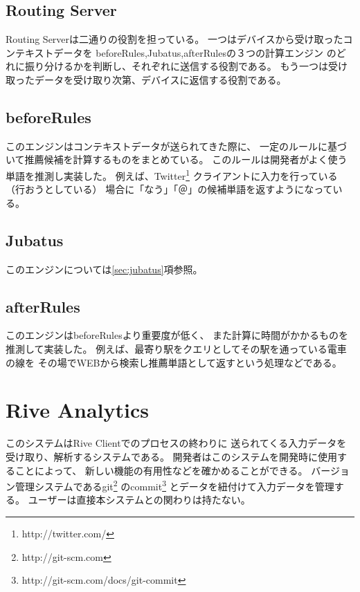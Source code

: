 \subsection{Routing Server}
Routing Serverは二通りの役割を担っている。
一つはデバイスから受け取ったコンテキストデータを
beforeRules,Jubatus,afterRulesの３つの計算エンジン
のどれに振り分けるかを判断し、それぞれに送信する役割である。
もう一つは受け取ったデータを受け取り次第、デバイスに返信する役割である。

\subsection{beforeRules}
\label{sec:beforerules}
このエンジンはコンテキストデータが送られてきた際に、
一定のルールに基づいて推薦候補を計算するものをまとめている。
このルールは開発者がよく使う単語を推測し実装した。
例えば、Twitter\footnote{http://twitter.com/}
クライアントに入力を行っている（行おうとしている）
場合に「なう」「＠」の候補単語を返すようになっている。

\subsection{Jubatus}
このエンジンについては\ref{sec:jubatus}項参照。

\subsection{afterRules}
\label{sec:afterrules}
このエンジンはbeforeRulesより重要度が低く、
また計算に時間がかかるものを推測して実装した。
例えば、最寄り駅をクエリとしてその駅を通っている電車の線を
その場でWEBから検索し推薦単語として返すという処理などである。

\section{Rive Analytics}
このシステムはRive Clientでのプロセスの終わりに
送られてくる入力データを受け取り、解析するシステムである。
開発者はこのシステムを開発時に使用することによって、
新しい機能の有用性などを確かめることができる。
バージョン管理システムであるgit\footnote{http://git-scm.com}
のcommit\footnote{http://git-scm.com/docs/git-commit}
とデータを紐付けて入力データを管理する。
ユーザーは直接本システムとの関わりは持たない。

